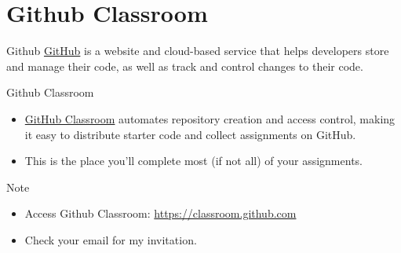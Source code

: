\documentclass[12pt,letterpaper]{beamer}
\begin{document}
\section{Github Classroom}
\begin{frame}{Github}
    \href{https://github.com}{GitHub} is a website and cloud-based service that helps developers store and manage their code, as well as track and control changes to their code. 
\end{frame}

\begin{frame}{Github Classroom}
\begin{itemize}
    \item \href{https://classroom.github.com}{GitHub Classroom} automates repository creation and access control, making it easy to distribute starter code and collect assignments on GitHub.
    \item This is the place you'll complete most (if not all) of your assignments.
\end{itemize}


\begin{alertblock}{Note}
{\footnotesize 
\begin{itemize}
        \item Access Github Classroom: \href{https://classroom.github.com}{https://classroom.github.com}
        \item Check your email for my invitation.
    \end{itemize}
}
\end{alertblock}   

\end{frame}
\end{document}

